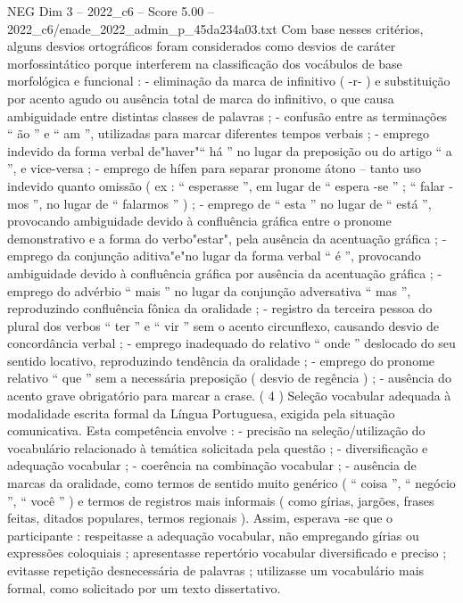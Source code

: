 \begin{textsample}{NEG Dim 3 – 2022\_c6 – Score 5.00 – 2022\_c6/enade\_2022\_admin\_p\_45da234a03.txt}
Com base nesses critérios, alguns desvios ortográficos foram considerados como desvios de caráter morfossintático porque interferem na classificação dos vocábulos de base morfológica e funcional : - eliminação da marca de infinitivo ( -r- ) e substituição por acento agudo ou ausência total de marca do infinitivo, o que causa ambiguidade entre distintas classes de palavras ; - confusão entre as terminações “ ão ” e “ am ”, utilizadas para marcar diferentes tempos verbais ; - emprego indevido da forma verbal de"haver"“ há ” no lugar da preposição ou do artigo “ a ”, e vice-versa ; - emprego de hífen para separar pronome átono – tanto uso indevido quanto omissão ( ex : “ esperasse ”, em lugar de “ espera -se ” ; “ falar -mos ”, no lugar de “ falarmos ” ) ; - emprego de “ esta ” no lugar de “ está ”, provocando ambiguidade devido à confluência gráfica entre o pronome demonstrativo e a forma do verbo"estar", pela ausência da acentuação gráfica ; - emprego da conjunção aditiva"e"no lugar da forma verbal “ é ”, provocando ambiguidade devido à confluência gráfica por ausência da acentuação gráfica ; - emprego do advérbio “ mais ” no lugar da conjunção adversativa “ mas ”, reproduzindo confluência fônica da oralidade ; - registro da terceira pessoa do plural dos verbos “ ter ” e “ vir ” sem o acento circunflexo, causando desvio de concordância verbal ; - emprego inadequado do relativo “ onde ” deslocado do seu sentido locativo, reproduzindo tendência da oralidade ; - emprego do pronome relativo “ que ” sem a necessária preposição ( desvio de regência ) ; - ausência do acento grave obrigatório para marcar a crase. ( 4 ) Seleção vocabular adequada à modalidade escrita formal da Língua Portuguesa, exigida pela situação comunicativa.
Esta competência envolve : - precisão na seleção/utilização do vocabulário relacionado à temática solicitada pela questão ; - diversificação e adequação vocabular ; - coerência na combinação vocabular ; - ausência de marcas da oralidade, como termos de sentido muito genérico ( “ coisa ”, “ negócio ”, “ você ” ) e termos de registros mais informais ( como gírias, jargões, frases feitas, ditados populares, termos regionais ).
Assim, esperava -se que o participante : respeitasse a adequação vocabular, não empregando gírias ou expressões coloquiais ; apresentasse repertório vocabular diversificado e preciso ; evitasse repetição desnecessária de palavras ; utilizasse um vocabulário mais formal, como solicitado por um texto dissertativo.

\end{textsample}
